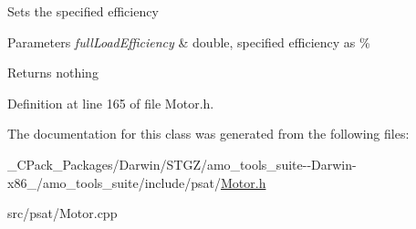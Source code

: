 Sets the specified efficiency


\begin{DoxyParams}{Parameters}
{\em full\+Load\+Efficiency} & double, specified efficiency as \%\\
\hline
\end{DoxyParams}
\begin{DoxyReturn}{Returns}
nothing 
\end{DoxyReturn}


Definition at line 165 of file Motor.\+h.



The documentation for this class was generated from the following files\+:\begin{DoxyCompactItemize}
\item 
\+\_\+\+C\+Pack\+\_\+\+Packages/\+Darwin/\+S\+T\+G\+Z/amo\+\_\+tools\+\_\+suite-\/-\/\+Darwin-\/x86\+\_/amo\+\_\+tools\+\_\+suite/include/psat/\hyperlink{___c_pack___packages_2_darwin_2_s_t_g_z_2amo__tools__suite--_darwin-x86__64_2amo__tools__suite_2include_2psat_2_motor_8h}{Motor.\+h}\item 
src/psat/Motor.\+cpp\end{DoxyCompactItemize}
